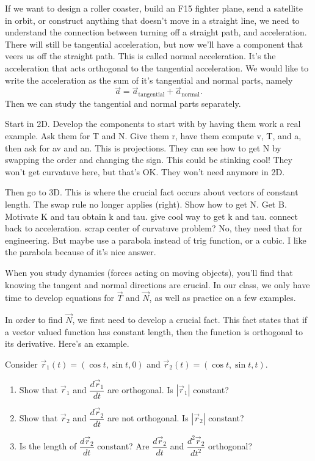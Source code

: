 If we want to design a roller coaster, build an F15 fighter plane, send a satellite in orbit, or construct anything that doesn't move in a straight line, we need to understand the connection between turning off a straight path, and acceleration. There will still be tangential acceleration, but now we'll have a component that veers us off the straight path.  This is called normal acceleration.  It's the acceleration that acts orthogonal to the tangential acceleration.  We would like to write the acceleration as the sum of it's tangential and normal parts, namely 
$$\vec a = \vec a_{\text{tangential}} + \vec a_{\text{normal}}.$$
Then we can study the tangential and normal parts separately.


Start in 2D.  Develop the components to start with by having them work a real example.  Ask them for T and N.  Give them r, have them compute v, T, and a, then ask for av and an.  This is projections.
They can see how to get N by swapping the order and changing the sign. This could be stinking cool!  
They won't get curvatuve here, but that's OK.
They won't need anymore in 2D.  

Then go to 3D.  This is where the crucial fact occurs about vectors of constant length.
The swap rule no longer applies (right).
Show how to get N.
Get B.
Motivate K and tau
obtain k and tau.
give cool way to get k and tau.
connect back to acceleration.
scrap center of curvatuve problem?  No, they need that for engineering.  But maybe use a parabola instead of trig function, or a cubic. I like the parabola because of it's nice answer.


When you study dynamics (forces acting on moving objects), you'll find that knowing the tangent and normal directions are crucial. In our class, we only have time to develop equations for $\vec T$ and $\vec N$, as well as practice on a few examples. 

In order to find $\vec N$, we first need to develop a crucial fact.  This fact states that if a vector valued function has constant length, then the function is orthogonal to its derivative. Here's an example. 

\begin{problem}
 Consider  $\vec r_1(t)=(\cos t, \sin t, 0)$ and $\vec r_2(t)=(\cos t, \sin t, t)$. 
\begin{enumerate}
 \item Show that $\vec r_1$ and $\dfrac{d\vec r_1}{dt}$ are orthogonal. Is $|\vec r_1|$ constant?
 \item Show that $\vec r_2$ and $\dfrac{d\vec r_2}{dt}$ are not orthogonal. Is $|\vec r_2|$ constant?
 \item Is the length of $\dfrac{d\vec r_2}{dt}$ constant? Are $\dfrac{d\vec r_2}{dt}$ and $\dfrac{d^2\vec r_2}{dt^2}$ orthogonal? 
\end{enumerate}
\end{problem}

